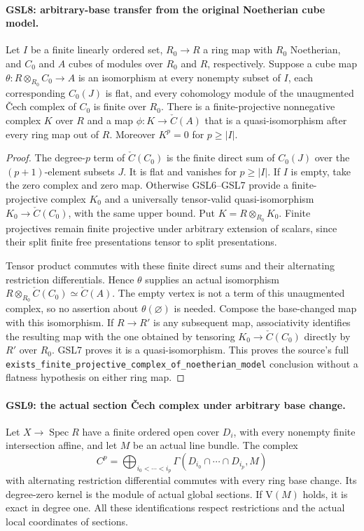 \documentclass[11pt,a4paper]{article}
\numberwithin{equation}{section}
\theoremstyle{remark}\newtheorem{remark}[theorem]{Remark}
\begin{document}
\paragraph{GSL8: arbitrary-base transfer from the original Noetherian cube model.}
\label{claim:GSL8}
Let $I$ be a finite linearly ordered set, $R_0\to R$ a ring map
with $R_0$ Noetherian, and $C_0$ and $A$ cubes of modules over
$R_0$ and $R$, respectively.  Suppose a cube map
$\theta:R\otimes_{R_0}C_0\to A$ is an isomorphism at every
nonempty subset of $I$, each corresponding $C_0(J)$ is flat,
and every cohomology module of the unaugmented \v Cech complex
of $C_0$ is finite over $R_0$.  There is a finite-projective
nonnegative complex $K$ over $R$ and a map
$\phi:K\to\check C(A)$ that is a quasi-isomorphism after every
ring map out of $R$.  Moreover $K^p=0$ for $p\ge |I|$.

\begin{proof}
The degree-$p$ term of $\check C(C_0)$ is the finite direct sum of
$C_0(J)$ over the $(p+1)$-element subsets $J$.  It is flat and
vanishes for $p\ge |I|$.  If $I$ is empty, take the zero complex
and zero map.  Otherwise GSL6--GSL7 provide a finite-projective
complex $K_0$ and a universally tensor-valid quasi-isomorphism
$K_0\to\check C(C_0)$, with the same upper bound.  Put
$K=R\otimes_{R_0}K_0$.  Finite projectives remain finite
projective under arbitrary extension of scalars, since their split
finite free presentations tensor to split presentations.

Tensor product commutes with these finite direct sums and their
alternating restriction differentials.  Hence $\theta$ supplies
an actual isomorphism
$R\otimes_{R_0}\check C(C_0)\simeq\check C(A)$.  The empty
vertex is not a term of this unaugmented complex, so no assertion
about $\theta(\varnothing)$ is needed.  Compose the base-changed
map with this isomorphism.  If $R\to R'$ is any subsequent map,
associativity identifies the resulting map with the one obtained by
tensoring $K_0\to\check C(C_0)$ directly by $R'$ over $R_0$.
GSL7 proves it is a quasi-isomorphism.  This proves the source's
full \texttt{exists\_\allowbreak finite\_\allowbreak projective\_\allowbreak complex\_\allowbreak of\_\allowbreak noetherian\_\allowbreak model}
conclusion without a flatness hypothesis on either ring map.
\end{proof}

\paragraph{GSL9: the actual section \v Cech complex under arbitrary base change.}
\label{claim:GSL9}
Let $X\to\operatorname{Spec}R$ have a finite ordered open cover
$D_i$, with every nonempty finite intersection affine, and let $M$
be an actual line bundle.  The complex
\[
 C^p=\bigoplus_{i_0<\cdots<i_p}
       \Gamma(D_{i_0}\cap\cdots\cap D_{i_p},M)
 \tag{GSL.5}
\]
with alternating restriction differential commutes with every ring
base change.  Its degree-zero kernel is the module of actual global
sections.  If $\mathrm V(M)$ holds, it is exact in degree one.
All these identifications respect restrictions and the actual local
coordinates of sections.
\end{document}
